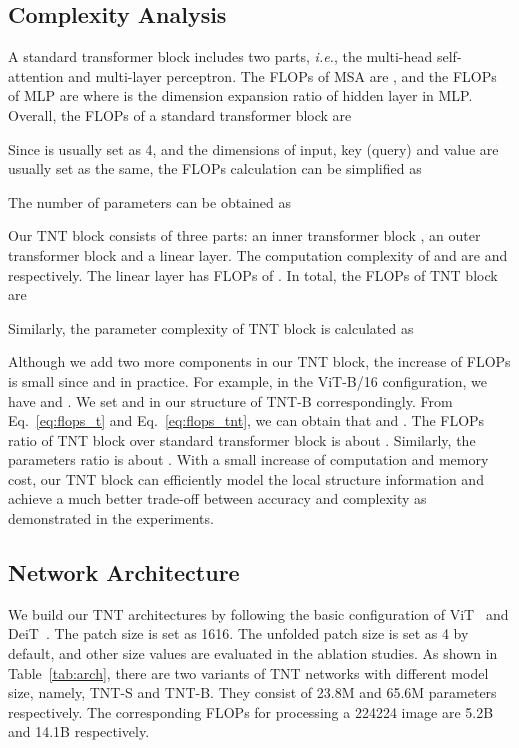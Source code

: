 \documentclass{article}
\begin{document}
\subsection{Complexity Analysis}
A standard transformer block includes two parts, \emph{i.e.}, the multi-head self-attention and multi-layer perceptron. The FLOPs of MSA are , and the FLOPs of MLP are  where  is the dimension expansion ratio of hidden layer in MLP. Overall, the FLOPs of a standard transformer block are

Since  is usually set as 4, and the dimensions of input, key (query) and value are usually set as the same, the FLOPs calculation can be simplified as

The number of parameters can be obtained as


Our TNT block consists of three parts: an inner transformer block , an outer transformer block  and a linear layer. The computation complexity of  and  are  and  respectively. The linear layer has FLOPs of . In total, the FLOPs of TNT block are

Similarly, the parameter complexity of TNT block is calculated as


Although we add two more components in our TNT block, the increase of FLOPs is small since  and  in practice. For example, in the ViT-B/16 configuration, we have  and . We set  and  in our structure of TNT-B correspondingly. From Eq.~\ref{eq:flops_t} and Eq.~\ref{eq:flops_tnt}, we can obtain that  and . The FLOPs ratio of TNT block over standard transformer block is about . Similarly, the parameters ratio is about . With a small increase of computation and memory cost, our TNT block can efficiently model the local structure information and achieve a much better trade-off between accuracy and complexity as demonstrated in the experiments.


\subsection{Network Architecture}
We build our TNT architectures by following the basic configuration of ViT~\cite{vit} and DeiT~\cite{deit}. The patch size is set as 1616. The unfolded patch size  is set as 4 by default, and other size values are evaluated in the ablation studies. As shown in Table~\ref{tab:arch}, there are two variants of TNT networks with different model size, namely, TNT-S and TNT-B. They consist of 23.8M and 65.6M parameters respectively. The corresponding FLOPs for processing a 224224 image are 5.2B and 14.1B respectively.
\end{document}
